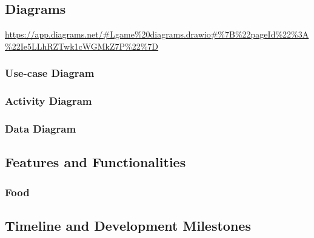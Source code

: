 \documentclass[11pt]{article}
\begin{document}
\subsection{Diagrams}
\url{https://app.diagrams.net/#Lgame%20diagrams.drawio#%7B%22pageId%22%3A%22Ie5LLhRZTwk1cWGMkZ7P%22%7D}

\subsubsection{Use-case Diagram}
\subsubsection{Activity Diagram}
\subsubsection{Data Diagram}


\subsection{Features and Functionalities}
\subsubsection{Food}


\subsection{Timeline and Development Milestones}
\end{document}
